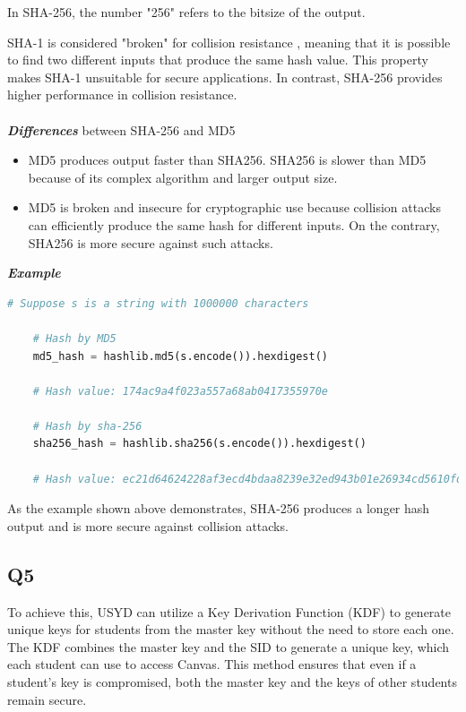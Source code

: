 \documentclass{article}
\begin{document}
In SHA-256, the number "256" refers to the bitsize of the output.

SHA-1 is considered "broken" for collision resistance \cite{2-1-1.Hash(1)}, meaning that it is possible to find two different inputs that produce the same hash value. This property makes SHA-1 unsuitable for secure applications. In contrast, SHA-256 provides higher performance in collision resistance.\\\\


\textbf{\textit{Differences}} between SHA-256 and MD5
\begin{itemize}
	\item MD5 produces output faster than SHA256. SHA256 is slower than MD5 because of its complex algorithm and larger output size\cite{9573660}.

	\item MD5 is broken and insecure for cryptographic use because collision attacks can efficiently produce the same hash for different inputs\cite{2-1-1.Hash(1)}. On the contrary, SHA256 is more secure against such attacks.
\end{itemize}

\textbf{\textit{Example}}

	\begin{lstlisting}[language=Python]
	# Suppose s is a string with 1000000 characters

	# Hash by MD5
	md5_hash = hashlib.md5(s.encode()).hexdigest()

	# Hash value: 174ac9a4f023a557a68ab0417355970e

	# Hash by sha-256
	sha256_hash = hashlib.sha256(s.encode()).hexdigest()

	# Hash value: ec21d64624228af3ecd4bdaa8239e32ed943b01e26934cd5610fddb361426dc6
	\end{lstlisting}

	As the example shown above demonstrates, SHA-256 produces a longer hash output and is more secure against collision attacks.

\subsection{Q5}

	To achieve this, USYD can utilize a Key Derivation Function (KDF) to generate unique keys for students from the master key without the need to store each one. The KDF combines the master key and the SID to generate a unique key\cite{adams2004security}, which each student can use to access Canvas. This method ensures that even if a student's key is compromised, both the master key and the keys of other students remain secure.
\end{document}
